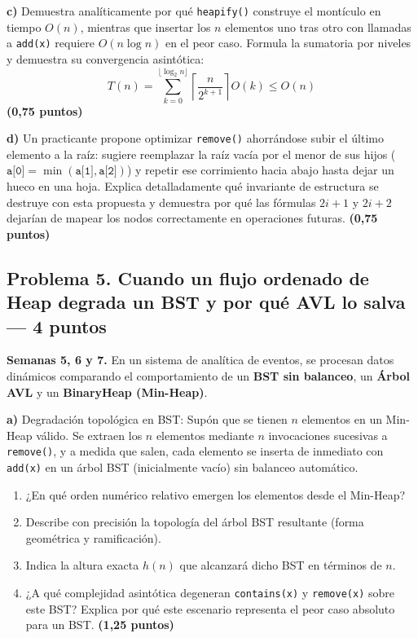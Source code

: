 \documentclass[10pt,a4paper]{article}
\newcommand{\pts}[1]{\textbf{(#1)}}
\begin{document}
\textbf{c)} Demuestra analíticamente por qué \texttt{heapify()} construye el montículo en tiempo $O(n)$, mientras que insertar los $n$ elementos uno tras otro con llamadas a \texttt{add(x)} requiere $O(n \log n)$ en el peor caso. Formula la sumatoria por niveles y demuestra su convergencia asintótica:
\[
T(n) = \sum_{k=0}^{\lfloor \log_2 n \rfloor} \left\lceil \frac{n}{2^{k+1}} \right\rceil O(k) \le O(n)
\]
\pts{0,75 puntos}

\textbf{d)} Un practicante propone optimizar \texttt{remove()} ahorrándose subir el último elemento a la raíz: sugiere reemplazar la raíz vacía por el menor de sus hijos ($\texttt{a[0]} = \min(\texttt{a[1]}, \texttt{a[2]})$) y repetir ese corrimiento hacia abajo hasta dejar un hueco en una hoja. Explica detalladamente qué invariante de estructura se destruye con esta propuesta y demuestra por qué las fórmulas $2i+1$ y $2i+2$ dejarían de mapear los nodos correctamente en operaciones futuras. \pts{0,75 puntos}

\newpage
\subsection*{Problema 5. Cuando un flujo ordenado de Heap degrada un BST y por qué AVL lo salva --- 4 puntos}

\footnotesize
\textbf{Semanas 5, 6 y 7.} En un sistema de analítica de eventos, se procesan datos dinámicos comparando el comportamiento de un \textbf{BST sin balanceo}, un \textbf{Árbol AVL} y un \textbf{BinaryHeap (Min-Heap)}.

\textbf{a)} Degradación topológica en BST:
Supón que se tienen $n$ elementos en un Min-Heap válido. Se extraen los $n$ elementos mediante $n$ invocaciones sucesivas a \texttt{remove()}, y a medida que salen, cada elemento se inserta de inmediato con \texttt{add(x)} en un árbol BST (inicialmente vacío) sin balanceo automático.
\begin{enumerate}[label=\roman*.,itemsep=1pt]
\item ¿En qué orden numérico relativo emergen los elementos desde el Min-Heap?
\item Describe con precisión la topología del árbol BST resultante (forma geométrica y ramificación).
\item Indica la altura exacta $h(n)$ que alcanzará dicho BST en términos de $n$.
\item ¿A qué complejidad asintótica degeneran \texttt{contains(x)} y \texttt{remove(x)} sobre este BST? Explica por qué este escenario representa el peor caso absoluto para un BST. \pts{1,25 puntos}
\end{enumerate}
\end{document}
